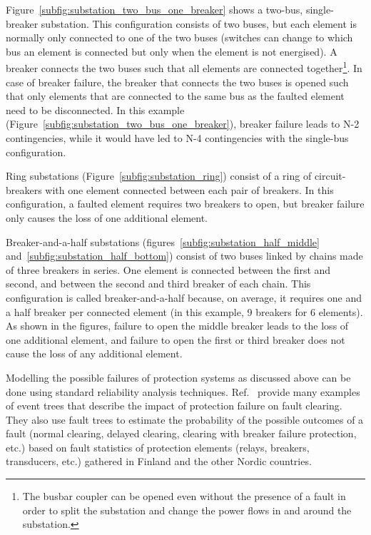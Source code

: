 Figure~\ref{subfig:substation_two_bus_one_breaker} shows a two-bus, single-breaker substation. This configuration consists of two buses, but each element is normally only connected to one of the two buses (switches can change to which bus an element is connected but only when the element is not energised). A breaker connects the two buses such that all elements are connected together\footnote{The busbar coupler can be opened even without the presence of a fault in order to split the substation and change the power flows in and around the substation.}. In case of breaker failure, the breaker that connects the two buses is opened such that only elements that are connected to the same bus as the faulted element need to be disconnected. In this example (Figure~\ref{subfig:substation_two_bus_one_breaker}), breaker failure leads to N-2 contingencies, while it would have led to N-4 contingencies with the single-bus configuration.

Ring substations (Figure~\ref{subfig:substation_ring}) consist of a ring of circuit-breakers with one element connected between each pair of breakers. In this configuration, a faulted element requires two breakers to open, but breaker failure only causes the loss of one additional element.

Breaker-and-a-half substations (figures~\ref{subfig:substation_half_middle} and~\ref{subfig:substation_half_bottom}) consist of two buses linked by chains made of three breakers in series. One element is connected between the first and second, and between the second and third breaker of each chain. This configuration is called breaker-and-a-half because, on average, it requires one and a half breaker per connected element (in this example, 9 breakers for 6 elements). As shown in the figures, failure to open the middle breaker leads to the loss of one additional element, and failure to open the first or third breaker does not cause the loss of any additional element.

Modelling the possible failures of protection systems as discussed above can be done using standard reliability analysis techniques. Ref.~\cite{GridPSA, Haarla} provide many examples of event trees that describe the impact of protection failure on fault clearing. They also use fault trees to estimate the probability of the possible outcomes of a fault (normal clearing, delayed clearing, clearing with breaker failure protection, etc.) based on fault statistics of protection elements (relays, breakers, transducers, etc.) gathered in Finland and the other Nordic countries.

